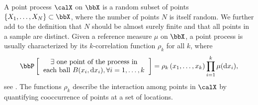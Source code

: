 \documentclass[twoside,11pt]{article}
\begin{document}
    A point process $\calX$ on $\bbX$ is a random subset of points $\lrcb{X_1, \dots, X_N} \subset \bbX$, where the number of points $N$ is itself random.
    We further add to the definition that $N$ should be almost surely finite and that all points in a sample are distinct.
    Given a reference measure $\mu$ on $\bbX$, a point process is usually characterized by its $k$-correlation function $\rho_k$ for all $k$, where
    \begin{equation*}
    	\Proba{
    		\begin{tabular}{c}
    			$\exists$ one point of the process in\\
    			each ball $B(x_i, \diff x_i), \forall i=1,\dots, k $
    		\end{tabular}
    	}
    	= \rho_k\lrp{x_1,\dots,x_k}
    		\prod_{i=1}^k \mu(\diff x_i),
    \end{equation*}
    see \citet[Section 4]{MoWa04}.
    The functions $\rho_k$ describe the interaction among points in $\calX$ by quantifying cooccurrence of points at a set of locations.

\end{document}
